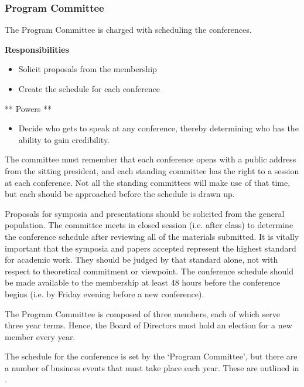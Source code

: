 \begin{refsection}
\subsubsection{Program Committee}
\label{programcommittee}

The Program Committee is charged with scheduling the conferences. 

\textbf{Responsibilities}

\begin{itemize}
\item Solicit proposals from the membership

\item Create the schedule for each conference

\end{itemize}

** Powers **

\begin{itemize}
\item Decide who gets to speak at any conference, thereby determining who has the ability to gain credibility.

\end{itemize}

The committee must remember that each conference opens with a public address from the sitting president, and each standing committee has the right to a session at each conference. Not all the standing committees will make use of that time, but each should be approached before the schedule is drawn up.

Proposals for symposia and presentations should be solicited from the general population. The committee meets in closed session (i.e. after class) to determine the conference schedule after reviewing all of the materials submitted. It is vitally important that the symposia and papers accepted represent the highest standard for academic work. They should be judged by that standard alone, not with respect to theoretical commitment or viewpoint. The conference schedule should be made available to the membership at least 48 hours before the conference begins (i.e. by Friday evening before a new conference).

The Program Committee is composed of three members, each of which serve three year terms. Hence, the Board of Directors must hold an election for a new member every year.

The schedule for the conference is set by the `Program Committee', but there are a number of business events that must take place each year. These are outlined in .


\end{refsection}
